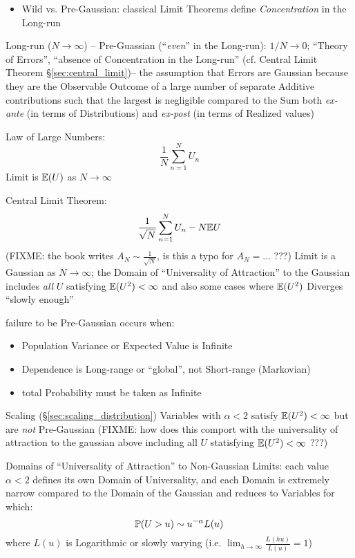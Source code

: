 \begin{itemize}
  \item Wild vs. Pre-Gaussian: classical Limit Theorems define
    \emph{Concentration} in the Long-run
\end{itemize}

Long-run ($N \to \infty$) -- Pre-Guassian (``\emph{even}'' in the Long-run):
$1 / N \to 0$; ``Theory of Errors'', ``absence of Concentration in the
Long-run'' (cf. Central Limit Theorem \S\ref{sec:central_limit})-- the
assumption that Errors are Gaussian because they are the Observable Outcome of a
large number of separate Additive contributions such that the largest is
negligible compared to the Sum both \emph{ex-ante} (in terms of Distributions)
and \emph{ex-post} (in terms of Realized values)

Law of Large Numbers:
\[
  \frac{1}{N} \sum_{n=1}^N U_n
\]
Limit is $\mathbb{E}(U)$ as $N \to \infty$

Central Limit Theorem:
\[
  \frac{1}{\sqrt{N}} \sum_{n=1}^N U_n - N \mathbb{E}{U}
\]
(FIXME: the book writes $A_N \sim \frac{1}{\sqrt{N}}$, is this a typo for
$A_N = ...$ ???)
Limit is a Gaussian as $N \to \infty$; the Domain of ``Universality of
Attraction'' to the Gaussian includes \emph{all} $U$ satisfying $\mathbb{E}(U^2) <
\infty$ and also some cases where $\mathbb{E}(U^2)$ Diverges ``slowly enough''

failure to be Pre-Gaussian occurs when:
\begin{itemize}
  \item Population Variance or Expected Value is Infinite
  \item Dependence is Long-range or ``global'', not Short-range (Markovian)
  \item total Probability must be taken as Infinite
\end{itemize}

Scaling (\S\ref{sec:scaling_distribution}) Variables with $\alpha < 2$ satisfy
$\mathbb{E}(U^2) < \infty$ but are \emph{not} Pre-Gaussian
(FIXME: how does this comport with the universality of attraction to the
gaussian above including all $U$ statisfying $\mathbb{E}(U^2) < \infty$ ???)

Domains of ``Universality of Attraction'' to Non-Gaussian Limits: each value
$\alpha < 2$ defines its own Domain of Universality, and each Domain is
extremely narrow compared to the Domain of the Gaussian and reduces to Variables
for which:
\[
  \mathbb{P}(U > u) \sim u^{-\alpha} L(u)
\]
where $L(u)$ is Logarithmic or slowly varying (i.e.
$\lim_{h \to \infty} \frac{L(hu)}{L(u)} = 1$)

